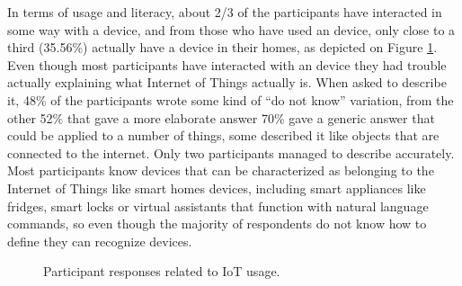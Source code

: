 In terms of \hyperlink{\acronym}{\acronym} usage and literacy, about 2/3 of the participants have interacted in
some way with a device, and from those who have used an \hyperlink{\acronym}{\acronym} device, only close
to a third (35.56\%) actually have a device in their homes, as depicted on
Figure \ref{fig:internet_of_things_device_usage}. Even though most participants
have interacted with an \hyperlink{\acronym}{\acronym} device they had trouble actually explaining what Internet
of Things actually is. When asked to describe it, 48\% of the participants
wrote some kind of ``do not know'' variation, from the other 52\% that gave
a more elaborate answer 70\% gave a generic answer that could be applied to
a number of things, some described it like objects that are connected
to the internet. Only two participants managed to describe \hyperlink{\acronym}{\acronym} accurately.
Most participants know devices that can be characterized as belonging to
the Internet of Things like smart homes devices, including smart
appliances like fridges, smart locks or virtual assistants that
function with natural language commands, so even though the majority
of respondents do not know how to define they can recognize \hyperlink{\acronym}{\acronym} devices.

\begin{figure}[H]
    \begin{center}
        \caption{Participant responses related to IoT usage.}
        \label{fig:internet_of_things_device_usage}
    \end{center}
\end{figure}


